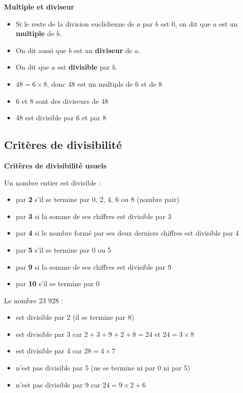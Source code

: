 \begin{definitionbox}
	\textbf{Multiple et diviseur}
	\begin{itemize}[label = \textbullet]
		\item Si le reste de la division euclidienne de $a$ par $b$ est 0, on dit que $a$ est un \textbf{multiple} de $b$.
		\item On dit aussi que $b$ est un \textbf{diviseur} de $a$.
		\item On dit que $a$ est \textbf{divisible} par $b$.
	\end{itemize}
\end{definitionbox}

\begin{examplebox}
	\begin{itemize}[label = \textbullet]
		\item $48 = 6 \times 8$, donc 48 est un multiple de 6 et de 8
		\item 6 et 8 sont des diviseurs de 48
		\item 48 est divisible par 6 et par 8
	\end{itemize}
\end{examplebox}

\subsection{Critères de divisibilité}

\begin{criterebox}
	\textbf{Critères de divisibilité usuels}
	
	Un nombre entier est divisible :
	\begin{itemize}[label = \textbullet]
		\item par \textbf{2} s'il se termine par 0, 2, 4, 6 ou 8 (nombre pair)
		\item par \textbf{3} si la somme de ses chiffres est divisible par 3
		\item par \textbf{4} si le nombre formé par ses deux derniers chiffres est divisible par 4
		\item par \textbf{5} s'il se termine par 0 ou 5
		\item par \textbf{9} si la somme de ses chiffres est divisible par 9
		\item par \textbf{10} s'il se termine par 0
	\end{itemize}
\end{criterebox}

\begin{examplebox}
	Le nombre 23 928 :
	\begin{itemize}[label = \textbullet]
		\item est divisible par 2 (il se termine par 8)
		\item est divisible par 3 car $2+3+9+2+8 = 24$ et $24 = 3 \times 8$
		\item est divisible par 4 car $28 = 4 \times 7$
		\item n'est pas divisible par 5 (ne se termine ni par 0 ni par 5)
		\item n'est pas divisible par 9 car $24 = 9 \times 2 + 6$
	\end{itemize}
\end{examplebox}